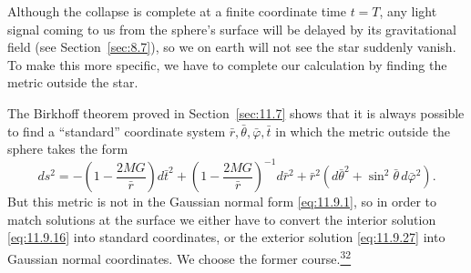 Although the collapse is complete at a finite coordinate time \(t=T\), any
light signal coming to us from the sphere's surface will be delayed by its
gravitational field (see Section~\ref{sec:8.7}), so we on earth will not see
the star suddenly vanish. To make this more specific, we have to complete our
calculation by finding the metric outside the star.

The Birkhoff theorem proved in Section~\ref{sec:11.7} shows that it is always
possible to find a ``standard'' coordinate system
\(\bar r,\bar\theta,\bar\varphi,\bar t\) in which the metric outside the
sphere takes the form
\begin{equation}
  ds^2
  =
  -\left(1-\frac{2MG}{\bar r}\right)d\bar t^2
  +\left(1-\frac{2MG}{\bar r}\right)^{-1}d\bar r^2
  +\bar r^2(d\bar\theta^2+\sin^2\bar\theta\,d\bar\varphi^2).
  \tag{11.9.27}\label{eq:11.9.27}
\end{equation}
But this metric is not in the Gaussian normal form \eqref{eq:11.9.1}, so in
order to match solutions at the surface we either have to convert the
interior solution \eqref{eq:11.9.16} into standard coordinates, or the
exterior solution \eqref{eq:11.9.27} into Gaussian normal coordinates. We
choose the former course.\hyperref[ch11-ref-32]{\textsuperscript{32}}


